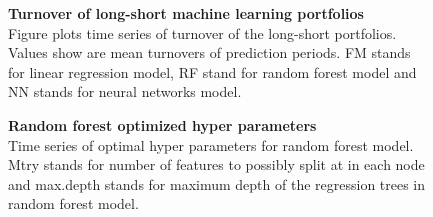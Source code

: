 \documentclass[12pt]{article}
\begin{document}
\begin{figure}[ht]
\centering
\caption[Turnover of long-short machine learning portfolios]{\textbf{Turnover of long-short machine learning portfolios}\\ Figure plots time series of turnover of the long-short portfolios. Values show are mean turnovers of prediction periods. FM stands for linear regression model, RF stand for random forest model and NN stands for neural networks model. }

\label{plot:Turnover}
\end{figure}

\begin{figure}[ht]
\centering
\caption[Optimized random forest hyperparameters]{\textbf{Random forest optimized hyper parameters}\\ Time series of optimal hyper parameters for random forest model. Mtry stands for number of features to possibly split at in each node and max.depth stands for maximum depth of the regression trees in random forest model.}

\label{plot:RFHyperParams}
\end{figure}

\clearpage



\end{document}
